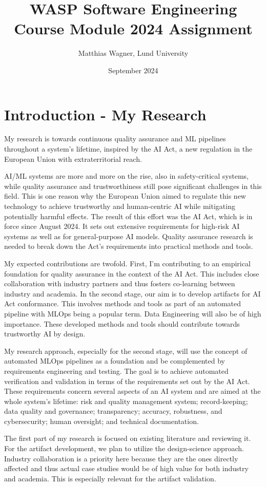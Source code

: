 \documentclass[titlepage,11pt]{article}
\title{WASP Software Engineering Course Module 2024 Assignment}
\author{Matthias Wagner, Lund University}
\date{September 2024}
\begin{document}
\maketitle

\section{Introduction - My Research}
My research is towards continuous quality assurance and ML pipelines throughout a system’s lifetime, inspired by the AI Act, a new regulation in the European Union with extraterritorial reach.

AI/ML systems are more and more on the rise, also in safety-critical systems, while quality assurance and trustworthiness still pose significant challenges in this field. This is one reason why the European Union aimed to regulate this new technology to achieve trustworthy and human-centric AI while mitigating potentially harmful effects.  The result of this effort was the AI Act, which is in force since August 2024. It sets out extensive requirements for high-risk AI systems as well as for general-purpose AI models. Quality assurance research is needed to break down the Act’s requirements into practical methods and tools.

My expected contributions are twofold. First, I’m contributing to an empirical foundation for quality assurance in the context of the AI Act. This includes close collaboration with industry partners and thus fosters co-learning between industry and academia.
In the second stage, our aim is to develop artifacts for AI Act conformance. This involves methods and tools as part of an automated pipeline with MLOps being a popular term. Data Engineering will also be of high importance. These developed methods and tools should contribute towards trustworthy AI by design.

My research approach, especially for the second stage, will use the concept of automated MLOps pipelines as a foundation and be complemented by requirements engineering and testing. The goal is to achieve automated verification and validation in terms of the requirements set out by the AI Act. These requirements concern several aspects of an AI system and are aimed at the whole system’s lifetime: risk and quality management system; record-keeping; data quality and governance; transparency; accuracy, robustness, and cybersecurity; human oversight; and technical documentation.

The first part of my research is focused on existing literature and reviewing it. For the artifact development, we plan to utilize the design-science approach. Industry collaboration is a priority here because they are the ones directly affected and thus actual case studies would be of high value for both industry and academia. This is especially relevant for the artifact validation.
\end{document}
